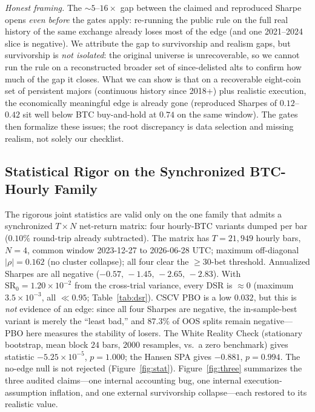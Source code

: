 \documentclass[sigconf,anonymous]{acmart}
\begin{document}
\emph{Honest framing.} The ${\sim}5$–$16\times$ gap between the claimed and reproduced Sharpe opens \emph{even before} the gates apply: re-running the public rule on the full real history of the same exchange already loses most of the edge (and one 2021–2024 slice is negative). We attribute the gap to survivorship and realism gaps, but survivorship is \emph{not isolated}: the original universe is unrecoverable, so we cannot run the rule on a reconstructed broader set of since-delisted alts to confirm how much of the gap it closes. What we can show is that on a recoverable eight-coin set of persistent majors (continuous history since 2018+) plus realistic execution, the economically meaningful edge is already gone (reproduced Sharpes of $0.12$–$0.42$ sit well below BTC buy-and-hold at $0.74$ on the same window). The gates then formalize these issues; the root discrepancy is data selection and missing realism, not solely our checklist.

\subsection{Statistical Rigor on the Synchronized BTC-Hourly Family}\label{sec:rigor}
The rigorous joint statistics are valid only on the one family that admits a synchronized $T\times N$ net-return matrix: four hourly-BTC variants dumped per bar ($0.10\%$ round-trip already subtracted). The matrix has $T{=}21{,}949$ hourly bars, $N{=}4$, common window 2023-12-27 to 2026-06-28 UTC; maximum off-diagonal $|\rho|{=}0.162$ (no cluster collapse); all four clear the $\ge 30$-bet threshold. Annualized Sharpes are all negative ($-0.57,\,-1.45,\,-2.65,\,-2.83$). With $\mathrm{SR}_0{=}1.20\times10^{-2}$ from the cross-trial variance, every DSR is $\approx 0$ (maximum $3.5\times10^{-3}$, all $\ll 0.95$; Table~\ref{tab:dsr}). CSCV PBO is a low $0.032$, but this is \emph{not} evidence of an edge: since all four Sharpes are negative, the in-sample-best variant is merely the ``least bad,'' and $87.3\%$ of OOS splits remain negative—PBO here measures the stability of losers. The White Reality Check (stationary bootstrap, mean block $24$ bars, $2000$ resamples, vs.\ a zero benchmark) gives statistic $-5.25\times10^{-5}$, $p{=}1.000$; the Hansen SPA gives $-0.881$, $p{=}0.994$. The no-edge null is not rejected (Figure~\ref{fig:stat}). Figure~\ref{fig:three} summarizes the three audited claims—one internal accounting bug, one internal execution-assumption inflation, and one external survivorship collapse—each restored to its realistic value.
\end{document}
